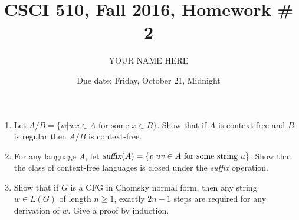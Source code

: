 \documentclass{article}
\title{CSCI 510, Fall 2016, Homework \# 2}
\author{YOUR NAME HERE}
\date{Due date: Friday, October 21, Midnight}
\begin{document}
\maketitle
\begin{enumerate}
\item Let $A/B=\{w| \mbox{$wx\in A$ for some $x\in B$}\}$.  Show that
  if $A$ is context free and $B$ is regular then $A/B$ is context-free.

\item For any language $A$, let $\mbox{\sl suffix}(A) =
  \{v|\mbox{$uv\in A$ for some string $u$}\}$.  Show that the class of
  context-free languages is closed under the {\sl suffix} operation.

\item Show that if $G$ is a CFG in Chomsky normal form, then any
  string $w\in L(G)$ of length $n\geq 1$, exactly $2n-1$ steps are
  required for any derivation of $w$.  Give a proof by induction.
\end{enumerate}
\end{document}

